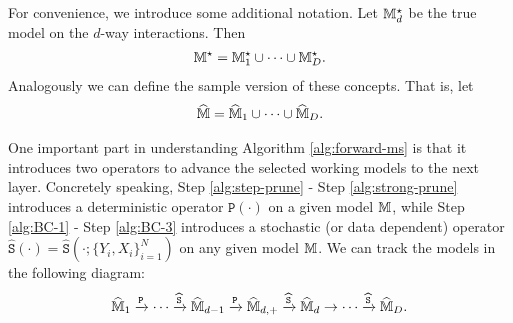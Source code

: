 \documentclass[12pt]{article}
\begin{document}
For convenience, we introduce some additional notation. Let ${{\mathbb{M}}}^\star_d$ be the true model on the $d$-way interactions. Then 
\begin{align*}
    {{\mathbb{M}}^\star} = {{\mathbb{M}}}^\star_1\cup\cdots\cup{{\mathbb{M}}}^\star_D.
\end{align*}
Analogously we can define the sample version of these concepts. That is, let 
\begin{align*}
    \widehat{{\mathbb{M}}} = \widehat{{\mathbb{M}}}_1\cup\cdots\cup\widehat{{\mathbb{M}}}_D.
\end{align*}

One important part in understanding Algorithm \ref{alg:forward-ms} is that it introduces two operators to advance the selected working models to the next layer. Concretely speaking, Step \ref{alg:step-prune} - Step \ref{alg:strong-prune} introduces a deterministic operator $\texttt{P}(\cdot)$ on a given model ${\mathbb{M}}$, while Step \ref{alg:BC-1} - Step \ref{alg:BC-3} introduces a stochastic (or data dependent) operator $ \hat{\texttt{S}}(\cdot) =  \hat{\texttt{S}}(\cdot; \{Y_i,X_i\}_{i=1}^N)$ on any given model ${\mathbb{M}}$.  We can track the models in the following diagram:
\begin{align}%
    \hat{\bbM}_{1}\xrightarrow{\texttt{P}}\cdots\xrightarrow{ \hat{\texttt{S}}}\hat{\bbM}_{d-1}\xrightarrow{\texttt{P}}\hat{\bbM}_{d,+}\xrightarrow{ \hat{\texttt{S}}}\hat{\bbM}_{d}\to \cdots \xrightarrow{ \hat{\texttt{S}}} \hat{\bbM}_{D}.
\end{align}
\end{document}
